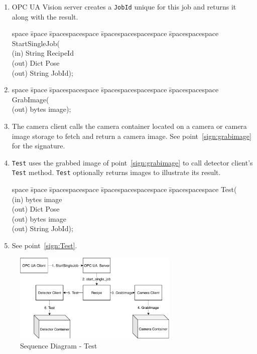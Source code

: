 \begin{enumerate}
    \item OPC UA Vision server creates a \texttt{JobId} unique for this job and returns it along with the result.
    \begin{tabbing}
    space \= space \= spacespacespace \= spacespacespacespace \= spacespacespace \kill
    \>  StartSingleJob(\\
    \>  \>  (in)	 \> 	String          \> RecipeId\\
    \>  \>  (out)	 \> 	Dict          \> Pose \\
    \>  \>  (out)	 \> 	String          \> JobId); 
    \end{tabbing}
    \item 
    \begin{tabbing}
    space \= space \= spacespacespace \= spacespacespacespace \= spacespacespace \kill
    \>  GrabImage(\\
    \>  \>  (out)	 \> 	bytes          \> image); 
    \end{tabbing} \label{sign:grabimage}
    \item The camera client calls the camera container located on a camera or camera image storage to fetch and return a camera image. See point~\ref{sign:grabimage} for the signature.
    \item \texttt{Test} uses the grabbed image of point~\ref{sign:grabimage} to call detector client's \texttt{Test} method. \texttt{Test} optionally returns images to illustrate its result. 
    \begin{tabbing}
    space \= space \= spacespacespace \= spacespacespacespace \= spacespacespace \kill
    \>  Test(\\
    \>  \>  (in)	 \> 	bytes          \> image\\
    \>  \>  (out)	 \> 	Dict          \> Pose \\
    \>  \>  (out)	 \> 	bytes          \> image \\
    \>  \>  (out)	 \> 	String          \> JobId); 
    \end{tabbing}\label{sign:Test}
    \item See point~\ref{sign:Test}.
\end{enumerate}

\begin{figure}[ht]
	\centering
  \includegraphics[width=0.7\textwidth]{img/SequenceDiagram-Test.pdf}
	\caption{Sequence Diagram - Test}
	\label{fig:SequenceDiagram-Test}
\end{figure}

